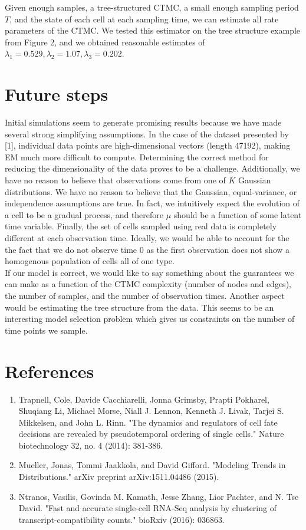 \documentclass[11pt,onecolumn]{article}
\begin{document}
Given enough samples, a tree-structured CTMC, a small enough sampling period $T$, and the state of each cell at each sampling time, we can estimate all rate parameters of the CTMC. We tested this estimator on the tree structure example from Figure 2, and we obtained reasonable estimates of $\lambda_1 = 0.529, \lambda_2 = 1.07, \lambda_3 = 0.202$.

\section{Future steps}
Initial simulations seem to generate promising results because we have made several strong simplifying assumptions. In the case of the dataset presented by [1], individual data points are high-dimensional vectors (length 47192), making EM much more difficult to compute. Determining the correct method for reducing the dimensionality of the data proves to be a challenge. Additionally, we have no reason to believe that observations come from one of $K$ Gaussian distributions. We have no reason to believe that the Gaussian, equal-variance, or independence assumptions are true. In fact, we intuitively expect the evolution of a cell to be a gradual process, and therefore $\mu$ should be a function of some latent time variable. Finally, the set of cells sampled using real data is completely different at each observation time. Ideally, we would be able to account for the the fact that we do not observe time 0 as the first observation does not show a homogenous population of cells all of one type. \\

If our model is correct, we would like to say something about the guarantees we can make as a function of the CTMC complexity (number of nodes and edges), the number of samples, and the number of observation times. Another aspect would  be estimating the tree structure from the data. This seems to be an interesting model selection problem which gives us constraints on the number of time points we sample.

\section{References}
\begin{enumerate}
	\item Trapnell, Cole, Davide Cacchiarelli, Jonna Grimsby, Prapti Pokharel, Shuqiang Li, Michael Morse, Niall J. Lennon, Kenneth J. Livak, Tarjei S. Mikkelsen, and John L. Rinn. "The dynamics and regulators of cell fate decisions are revealed by pseudotemporal ordering of single cells." Nature biotechnology 32, no. 4 (2014): 381-386.
	\item Mueller, Jonas, Tommi Jaakkola, and David Gifford. "Modeling Trends in Distributions." arXiv preprint arXiv:1511.04486 (2015).
	\item Ntranos, Vasilis, Govinda M. Kamath, Jesse Zhang, Lior Pachter, and N. Tse David. "Fast and accurate single-cell RNA-Seq analysis by clustering of transcript-compatibility counts." bioRxiv (2016): 036863.
\end{enumerate}
\end{document}
